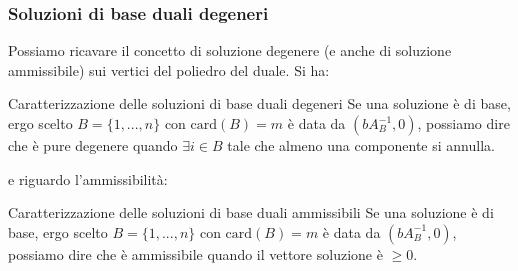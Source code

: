 \documentclass[a4paper,11pt]{article}
\begin{document}
\subsubsection{Soluzioni di base duali degeneri}
Possiamo ricavare il concetto di soluzione degenere (e anche di soluzione ammissibile) sui vertici del poliedro del duale. Si ha:

\begin{theorem}{Caratterizzazione delle soluzioni di base duali degeneri}
	Se una soluzione è di base, ergo scelto $B = \{ 1, ..., n \}$ con $\mathrm{card}(B) = m$ è data da $(bA_B^{-1}, 0)$, possiamo dire che è pure degenere quando $\exists i \in B$ tale che almeno una componente si annulla. 
\end{theorem}
e riguardo l'ammissibilità:
\begin{theorem}{Caratterizzazione delle soluzioni di base duali ammissibili}
	Se una soluzione è di base, ergo scelto $B = \{ 1, ..., n \}$ con $\mathrm{card}(B) = m$ è data da $(bA_B^{-1}, 0)$, possiamo dire che è ammissibile quando il vettore soluzione è $\geq 0$. 
\end{theorem}
\end{document}
